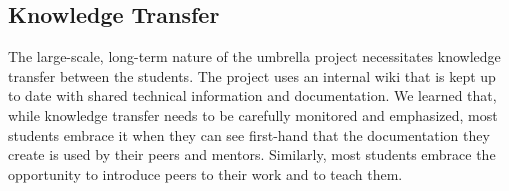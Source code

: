 \documentclass[journal,twopages]{IEEEtran}
\begin{document}
\subsection{Knowledge Transfer}

The large-scale, long-term nature of the umbrella project necessitates knowledge transfer between the students. The project uses an internal wiki that is kept up to date with shared technical information and documentation. We learned that, while knowledge transfer needs to be carefully monitored and emphasized, most students embrace it when they can see first-hand that the documentation they create is used by their peers and mentors. Similarly, most students embrace the opportunity to introduce peers to their work and to teach them.









\iffalse
\begin{itemize}
\item System demonstrations at high-profile conferences, with many student coauthors from different labs
    \begin{itemize}
    \item Four conference demonstrations with the total 18 student coauthor (5 undergraduate, 8 Masters, and 5 Ph.D.\ ).
    \item Best Student Demo Award at a major conference; 10 student coauthors from four labs.
    \end{itemize}
\item 10 major off-site (out of the lab) -- to different communities -- demonstrations altogether
\item Demonstrations require having robust setups, intense testing. Gives students a flavor of how a trade show demo would look like
    \begin{itemize}
    \item Altogether, for all ``off site'' demos, there were 12 student presenters (1 undergraduate, 8 M.S., 3 Ph.D.)
    \end{itemize}
\end{itemize}
\fi
\end{document}
